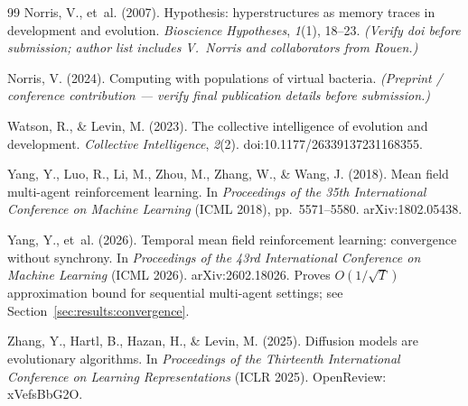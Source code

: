 \documentclass[twoside,11pt]{article}
\begin{document}
\begin{thebibliography}{99}
Norris, V., et~al. (2007).
Hypothesis: hyperstructures as memory traces in development and evolution.
\textit{Bioscience Hypotheses}, \textit{1}(1), 18--23.
\textit{(Verify doi before submission; author list includes V.~Norris and
collaborators from Rouen.)}

Norris, V. (2024).
Computing with populations of virtual bacteria.
\textit{(Preprint / conference contribution --- verify final publication
details before submission.)}

Watson, R., \& Levin, M. (2023).
The collective intelligence of evolution and development.
\textit{Collective Intelligence}, \textit{2}(2).
\textrm{doi:10.1177/26339137231168355.}

Yang, Y., Luo, R., Li, M., Zhou, M., Zhang, W., \& Wang, J. (2018).
Mean field multi-agent reinforcement learning.
In \textit{Proceedings of the 35th International Conference on Machine
Learning} (ICML 2018), pp.\ 5571--5580.
\textrm{arXiv:1802.05438.}

Yang, Y., et~al. (2026).
Temporal mean field reinforcement learning: convergence without synchrony.
In \textit{Proceedings of the 43rd International Conference on Machine
Learning} (ICML 2026).
\textrm{arXiv:2602.18026.  Proves $O(1/\sqrt{T})$ approximation bound for
sequential multi-agent settings; see Section~\ref{sec:results:convergence}.}

Zhang, Y., Hartl, B., Hazan, H., \& Levin, M. (2025).
Diffusion models are evolutionary algorithms.
In \textit{Proceedings of the Thirteenth International Conference on Learning
Representations} (ICLR 2025).
\textrm{OpenReview: xVefsBbG2O.}

\end{thebibliography}
\end{document}
